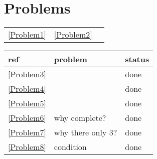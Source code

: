 \documentclass[11pt]{article}
\begin{document}
\section{Problems}
\label{sec:org53ebf41}
\begin{center}
\begin{tabular}{lll}
\ref{Problem1} & \ref{Problem2} & \\
\end{tabular}
\end{center}

\begin{center}
\begin{tabular}{lll}
ref & problem & status\\
\hline
\ref{Problem3} &  & done\\
\ref{Problem4} &  & done\\
\ref{Problem5} &  & done\\
\ref{Problem6} & why complete? & done\\
\ref{Problem7} & why there only 3? & done\\
\ref{Problem8} & condition & done\\
\end{tabular}
\end{center}

\label{bibliographystyle link}


\label{bibliography link}

\end{document}
